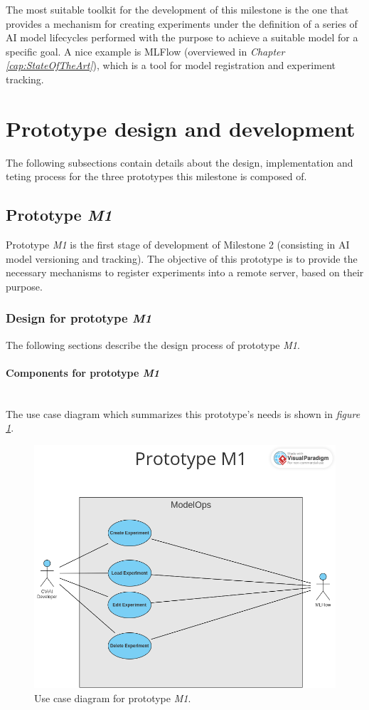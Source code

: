 The most suitable toolkit for the development of this milestone is the one that provides a mechanism for creating experiments under the 
definition of a series of \acrshort{AI} model lifecycles performed with the purpose to achieve a suitable model for a specific goal. A nice example is MLFlow
(overviewed in \emph{Chapter \ref{cap:StateOfTheArt}}), which is a tool for model registration and experiment tracking.

\section{Prototype design and development}

The following subsections contain details about the design, implementation and teting process for the three prototypes this milestone is composed of.

\subsection{Prototype \emph{M1}}

Prototype \emph{M1} is the first stage of development of Milestone 2 (consisting in \acrshort{AI} model versioning and tracking). The objective of this prototype is to provide 
the necessary mechanisms to register experiments into a remote server, based on their purpose.

\subsubsection{Design for prototype \emph{M1}}

The following sections describe the design process of prototype \emph{M1}.

\paragraph{Components for prototype \emph{M1}} \mbox{}\\

The use case diagram which summarizes this prototype's needs is shown in \emph{figure \ref{fig:useCaseM1}}.

\begin{figure}[H]
    \centering
    \includegraphics[width=0.7\linewidth]{figs/use-case-M1.png}
    \caption{Use case diagram for prototype \emph{M1}.}
    \label{fig:useCaseM1}
\end{figure}

